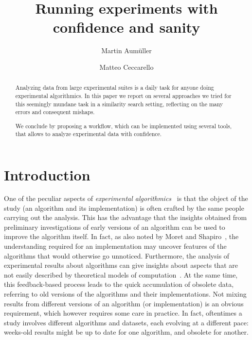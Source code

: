 \documentclass{llncs}
\begin{document}
\title{Running experiments with confidence and sanity}
%
%
\author{
  Martin Aumüller \and
  Matteo Ceccarello}
%
%
%
\maketitle              %
%
\begin{abstract}
Analyzing data from large experimental suites is a daily task for
anyone doing experimental algorithmics.
In this paper we report on several approaches we tried for this 
seemingly mundane task in a similarity search setting, reflecting on the many errors and consequent
mishaps.

We conclude by proposing a workflow, which can be implemented using several
tools, that allows to analyze experimental data with confidence.

\end{abstract}

\section{Introduction}

One of the peculiar aspects of \emph{experimental algorithmics}~\cite{DBLP:conf/dimacs/Moret99}
is that the object of the study (an algorithm and its implementation)
is often crafted by the same people carrying out the analysis.
This has the advantage that the insights obtained from preliminary
investigations of early versions of an algorithm can be used to improve the
algorithm itself.
In fact, as also noted by Moret and Shapiro~\cite{DBLP:journals/jucs/MoretS01},
the understanding required for an implementation may uncover features of the
algorithms that would otherwise go unnoticed.
Furthermore, the analysis of experimental results about algorithms can give
insights about aspects that are not easily described by theoretical
models of computation~\cite{DBLP:journals/cacm/McGeoch07}.
At the same time, this feedback-based process leads to the quick
accumulation of obsolete data, referring to old versions of the
algorithms and their implementations.
Not mixing results from different versions of
an algorithm (or implementation) is an obvious requirement, which
however requires some care in practice.
In fact, oftentimes a study involves different algorithms and datasets,
each evolving at a different pace: weeks-old results might be up to date
for one algorithm, and obsolete for another.
\end{document}
